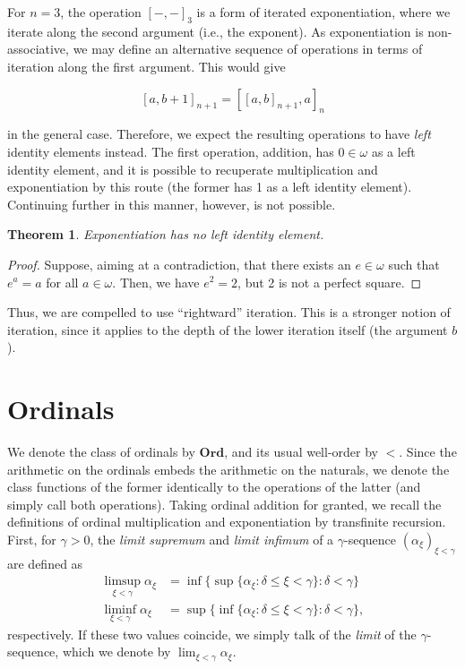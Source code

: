 \documentclass[12pt, a4paper]{article}
\newtheorem{theorem}{Theorem}[section]
\theoremstyle{definition}
\theoremstyle{remark}
\newcommand{\ord}{\mathbf{Ord}}
\begin{document}
For $n = 3$, the operation $[-,-]_3$ is a form of iterated exponentiation, where we iterate along the second argument (i.e., the exponent). As exponentiation is non-associative, we may define an alternative sequence of operations in terms of iteration along the first argument. This would give

\[[a, b+1]_{n+1} = [[a, b]_{n+1}, a]_n\]

in the general case. Therefore, we expect the resulting operations to have \emph{left} identity elements instead. The first operation, addition, has $0\in\omega$ as a left identity element, and it is possible to recuperate multiplication and exponentiation by this route (the former has 1 as a left identity element). Continuing further in this manner, however, is not possible.

\begin{theorem}
    Exponentiation has no left identity element.
\end{theorem}

\begin{proof}
    Suppose, aiming at a contradiction, that there exists an $e\in\omega$ such that $e^a = a$ for all $a\in\omega$. Then, we have $e^2 = 2$, but 2 is not a perfect square.
\end{proof}

Thus, we are compelled to use ``rightward'' iteration. This is a stronger notion of iteration, since it applies to the depth of the lower iteration itself (the argument $b$).

\section{Ordinals}

We denote the class of ordinals by $\ord$, and its usual well-order by $<$. Since the arithmetic on the ordinals embeds the arithmetic on the naturals, we denote the class functions of the former identically to the operations of the latter (and simply call both operations). Taking ordinal addition for granted, we recall the definitions of ordinal multiplication and exponentiation by transfinite recursion. First, for $\gamma > 0$, the \emph{limit supremum} and \emph{limit infimum} of a $\gamma$-sequence $(\alpha_\xi)_{\xi < \gamma}$ are defined as
\begin{align*}
    \textstyle\limsup_{\xi < \gamma} \alpha_\xi &= \inf {\{\sup {\{\alpha_\xi : \delta \leq \xi < \gamma\}} : \delta < \gamma\}}\\
    \textstyle\liminf_{\xi < \gamma} \alpha_\xi &= \sup {\{\inf {\{\alpha_\xi : \delta \leq \xi < \gamma\}} : \delta < \gamma\}},
\end{align*}
respectively. If these two values coincide, we simply talk of the \emph{limit} of the $\gamma$-sequence, which we denote by $\lim_{\xi < \gamma} \alpha_\xi$.
\end{document}
